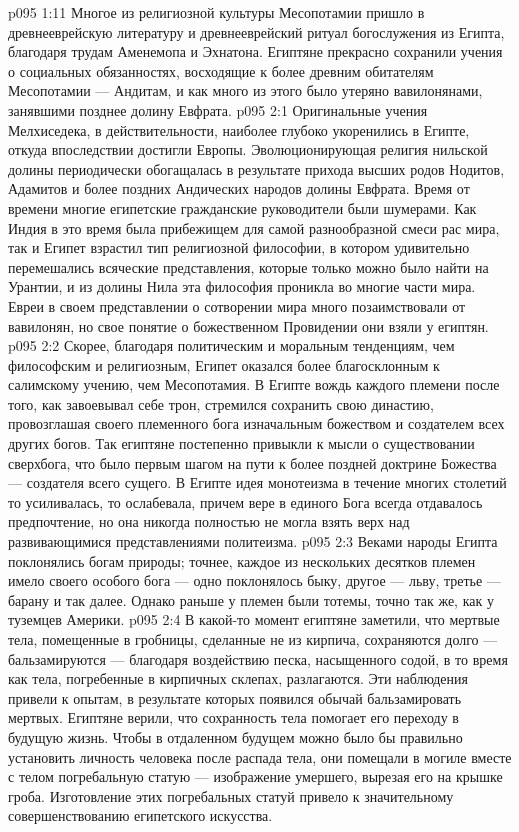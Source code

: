 \vs p095 1:11 Многое из религиозной культуры Месопотамии пришло в древнееврейскую литературу и древнееврейский ритуал богослужения из Египта, благодаря трудам Аменемопа и Эхнатона. Египтяне прекрасно сохранили учения о социальных обязанностях, восходящие к более древним обитателям Месопотамии --- Андитам, и как много из этого было утеряно вавилонянами, занявшими позднее долину Евфрата.
\vs p095 2:1 Оригинальные учения Мелхиседека, в действительности, наиболее глубоко укоренились в Египте, откуда впоследствии достигли Европы. Эволюционирующая религия нильской долины периодически обогащалась в результате прихода высших родов Нодитов, Адамитов и более поздних Андических народов долины Евфрата. Время от времени многие египетские гражданские руководители были шумерами. Как Индия в это время была прибежищем для самой разнообразной смеси рас мира, так и Египет взрастил тип религиозной философии, в котором удивительно перемешались всяческие представления, которые только можно было найти на Урантии, и из долины Нила эта философия проникла во многие части мира. Евреи в своем представлении о сотворении мира много позаимствовали от вавилонян, но свое понятие о божественном Провидении они взяли у египтян.
\vs p095 2:2 Скорее, благодаря политическим и моральным тенденциям, чем философским и религиозным, Египет оказался более благосклонным к салимскому учению, чем Месопотамия. В Египте вождь каждого племени после того, как завоевывал себе трон, стремился сохранить свою династию, провозглашая своего племенного бога изначальным божеством и создателем всех других богов. Так египтяне постепенно привыкли к мысли о существовании сверхбога, что было первым шагом на пути к более поздней доктрине Божества --- создателя всего сущего. В Египте идея монотеизма в течение многих столетий то усиливалась, то ослабевала, причем вере в единого Бога всегда отдавалось предпочтение, но она никогда полностью не могла взять верх над развивающимися представлениями политеизма.
\vs p095 2:3 Веками народы Египта поклонялись богам природы; точнее, каждое из нескольких десятков племен имело своего особого бога --- одно поклонялось быку, другое --- льву, третье --- барану и так далее. Однако раньше у племен были тотемы, точно так же, как у туземцев Америки.
\vs p095 2:4 \pc В какой\hyp{}то момент египтяне заметили, что мертвые тела, помещенные в гробницы, сделанные не из кирпича, сохраняются долго --- бальзамируются --- благодаря воздействию песка, насыщенного содой, в то время как тела, погребенные в кирпичных склепах, разлагаются. Эти наблюдения привели к опытам, в результате которых появился обычай бальзамировать мертвых. Египтяне верили, что сохранность тела помогает его переходу в будущую жизнь. Чтобы в отдаленном будущем можно было бы правильно установить личность человека после распада тела, они помещали в могиле вместе с телом погребальную статую --- изображение умершего, вырезая его на крышке гроба. Изготовление этих погребальных статуй привело к значительному совершенствованию египетского искусства.
